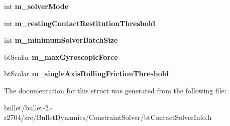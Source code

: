 \begin{DoxyCompactItemize}
\item 
\hypertarget{structbt_contact_solver_info_data_a5fecc357abf0c98e07674aa3ddd250c3}{int {\bfseries m\+\_\+solver\+Mode}}\label{structbt_contact_solver_info_data_a5fecc357abf0c98e07674aa3ddd250c3}

\item 
\hypertarget{structbt_contact_solver_info_data_a36260c73357a3b4c0734947d83698111}{int {\bfseries m\+\_\+resting\+Contact\+Restitution\+Threshold}}\label{structbt_contact_solver_info_data_a36260c73357a3b4c0734947d83698111}

\item 
\hypertarget{structbt_contact_solver_info_data_aac552c86c489bc1bc70a08704fc16851}{int {\bfseries m\+\_\+minimum\+Solver\+Batch\+Size}}\label{structbt_contact_solver_info_data_aac552c86c489bc1bc70a08704fc16851}

\item 
\hypertarget{structbt_contact_solver_info_data_a8fd37c9783ffcca34137a21f0624ec5d}{bt\+Scalar {\bfseries m\+\_\+max\+Gyroscopic\+Force}}\label{structbt_contact_solver_info_data_a8fd37c9783ffcca34137a21f0624ec5d}

\item 
\hypertarget{structbt_contact_solver_info_data_ae700464b3c0e463affd7c126a695ff81}{bt\+Scalar {\bfseries m\+\_\+single\+Axis\+Rolling\+Friction\+Threshold}}\label{structbt_contact_solver_info_data_ae700464b3c0e463affd7c126a695ff81}

\end{DoxyCompactItemize}


The documentation for this struct was generated from the following file\+:\begin{DoxyCompactItemize}
\item 
bullet/bullet-\/2.-\/r2704/src/\+Bullet\+Dynamics/\+Constraint\+Solver/bt\+Contact\+Solver\+Info.\+h\end{DoxyCompactItemize}
